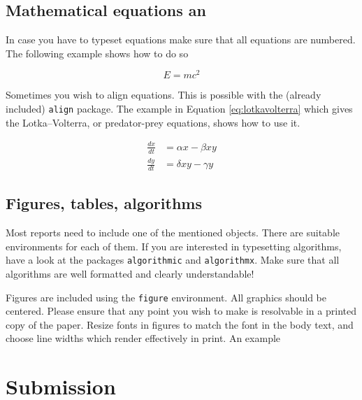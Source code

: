 \documentclass[10pt,a4paper,twoside,journal]{IEEEtran}
\begin{document}
\subsection{Mathematical equations an}

In case you have to typeset equations make sure that all equations are numbered.
The following example shows how to do so

\begin{equation}
	E = mc^2
\end{equation}

Sometimes you wish to align equations. This is possible with the (already
included) \texttt{align} package. The example in Equation \ref{eq:lotkavolterra}
which gives the Lotka--Volterra, or predator-prey equations, shows how to use
it.

\begin{align}\label{eq:lotkavolterra}
	\frac{dx}{dt} &= \alpha x - \beta x y \\
	\frac{dy}{dt} &= \delta x y - \gamma y
\end{align}

\subsection{Figures, tables, algorithms}

Most reports need to include one of the mentioned objects. There are suitable
environments for each of them. If you are interested in typesetting algorithms,
have a look at the packages \texttt{algorithmic} and \texttt{algorithmx}. Make
sure that all algorithms are well formatted and clearly understandable!

Figures are included using the \texttt{figure} environment. All graphics should
be centered.  Please ensure that any point you wish to make is resolvable in a
printed copy of the paper. Resize fonts in figures to match the font in the
body text, and choose line widths which render effectively in print. An example


\section{Submission}
\end{document}
